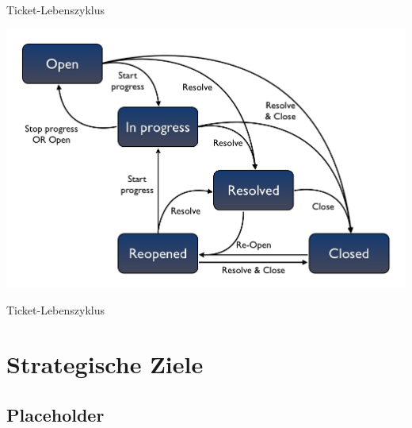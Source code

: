 \documentclass{beamer}
\begin{document}
\begin{frame}{Ticket-Lebenszyklus}
	\begin{center}
		\includegraphics[scale=.5]{jira-ticket-lifecycle.png}
	\end{center}
\end{frame}

\begin{frame}{Ticket-Lebenszyklus}
	\resizebox{!}{.75\textheight}{
		
	}
\end{frame}

\section{Strategische Ziele}
\subsection{Placeholder}
\end{document}
